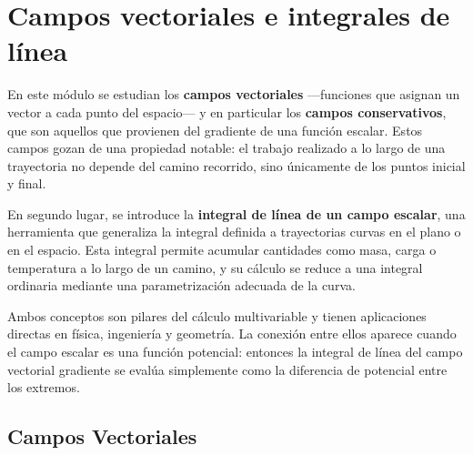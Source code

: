 
\chapter{Campos vectoriales e integrales de línea}

En este módulo se estudian los \textbf{campos vectoriales} —funciones que
asignan un vector a cada punto del espacio— y en particular los
\textbf{campos conservativos}, que son aquellos que provienen del
gradiente de una función escalar. Estos campos gozan de una propiedad
notable: el trabajo realizado a lo largo de una trayectoria no depende
del camino recorrido, sino únicamente de los puntos inicial y final.

En segundo lugar, se introduce la \textbf{integral de línea de un campo
escalar}, una herramienta que generaliza la integral definida a
trayectorias curvas en el plano o en el espacio. Esta integral permite
acumular cantidades como masa, carga o temperatura a lo largo de un
camino, y su cálculo se reduce a una integral ordinaria mediante una
parametrización adecuada de la curva.

Ambos conceptos son pilares del cálculo multivariable y tienen
aplicaciones directas en física, ingeniería y geometría. La conexión
entre ellos aparece cuando el campo escalar es una función potencial:
entonces la integral de línea del campo vectorial gradiente se evalúa
simplemente como la diferencia de potencial entre los extremos.

\section{Campos Vectoriales}

